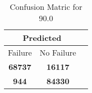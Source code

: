 \begin{table}[] 
\caption{Confusion Matric for 90.0} 
\label{Table: Prediction Accuracy-DMD90.0OnlySunEKF-ignoreReflection20.9EKF-top2-Reflection} 
\centering 
\begin{tabular} 
 {@{}ccc@{}} 
\toprule 
\multicolumn{2}{c}{\textbf{Predicted}}
 \\ \midrule 
\multicolumn{1}{|c|}{Failure} & 
\multicolumn{1}{c|}{No Failure}
 \\ \midrule 
\multicolumn{1}{|c|}{\color{green}\textbf{68737}} & 
\multicolumn{1}{c|}{\color{red}\textbf{16117}}
 \\ \midrule 
\multicolumn{1}{|c|}{\color{red}\textbf{944}} & 
\multicolumn{1}{c|}{\color{green}\textbf{84330}}
 \\ \bottomrule 
\end{tabular} 
\end{table} 
